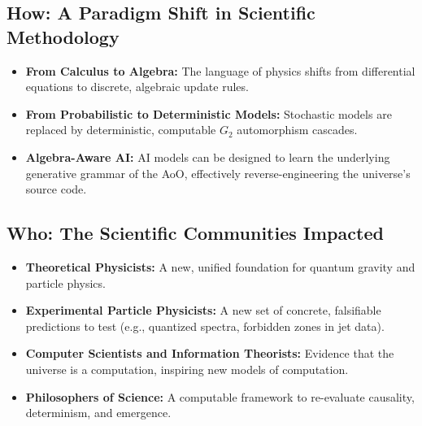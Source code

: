 \documentclass[11pt, a4paper]{article}
\theoremstyle{definition}
\theoremstyle{remark}
\begin{document}
\subsection*{How: A Paradigm Shift in Scientific Methodology}
\begin{itemize}
    \item \textbf{From Calculus to Algebra:} The language of physics shifts from differential equations to discrete, algebraic update rules.
    \item \textbf{From Probabilistic to Deterministic Models:} Stochastic models are replaced by deterministic, computable $G_2$ automorphism cascades.
    \item \textbf{Algebra-Aware AI:} AI models can be designed to learn the underlying generative grammar of the AoO, effectively reverse-engineering the universe's source code.
\end{itemize}

\subsection*{Who: The Scientific Communities Impacted}
\begin{itemize}
    \item \textbf{Theoretical Physicists:} A new, unified foundation for quantum gravity and particle physics.
    \item \textbf{Experimental Particle Physicists:} A new set of concrete, falsifiable predictions to test (e.g., quantized spectra, forbidden zones in jet data).
    \item \textbf{Computer Scientists and Information Theorists:} Evidence that the universe is a computation, inspiring new models of computation.
    \item \textbf{Philosophers of Science:} A computable framework to re-evaluate causality, determinism, and emergence.
\end{itemize}
\end{document}
